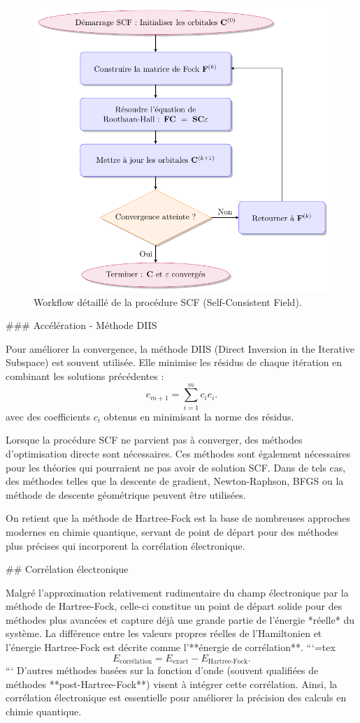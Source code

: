 \documentclass[12pt,a4paper]{report}
\begin{document}
\begin{markdown}
\begin{figure}[tbph]
\centering
\includegraphics[width=0.7\linewidth]{Graphics/SCF_Workflow}
\caption{Workflow détaillé de la procédure SCF (Self-Consistent Field).}
\label{fig:scfworkflow}
\end{figure}

### Accélération - Méthode DIIS

Pour améliorer la convergence, la méthode DIIS (Direct Inversion in the Iterative Subspace) est souvent utilisée. Elle minimise les résidus de chaque itération en combinant les solutions précédentes :
\[
e_{m+1} = \sum_{i=1}^m c_i e_i.
\]
avec des coefficients \(c_i\) obtenus en minimisant la norme des résidus.

Lorsque la procédure SCF ne parvient pas à converger, des méthodes d'optimisation directe sont nécessaires. Ces
méthodes sont également nécessaires pour les théories qui pourraient ne pas avoir de solution SCF. Dans de tels cas, des
méthodes telles que la descente de gradient, Newton-Raphson, BFGS ou la méthode de descente géométrique peuvent être utilisées.

On retient que la méthode de Hartree-Fock est la base de nombreuses approches modernes en chimie quantique, servant de point de départ pour des méthodes plus précises qui incorporent la corrélation électronique.

## Corrélation électronique

Malgré l'approximation relativement rudimentaire du champ électronique par la méthode de Hartree-Fock, celle-ci constitue un point de départ solide pour des méthodes plus avancées et capture déjà une grande partie de l’énergie *réelle* du système. La différence entre les valeurs propres réelles de l’Hamiltonien et l’énergie Hartree-Fock est décrite comme l’**énergie de corrélation**.
```{=tex}
\[
E_{\text{corrélation}} = E_{\text{exact}} - E_{\text{Hartree-Fock}}.
\]
```
 D'autres méthodes basées sur la fonction d'onde (souvent qualifiées de méthodes **post-Hartree-Fock**) visent à intégrer cette corrélation. Ainsi, la corrélation électronique est essentielle pour améliorer la précision des calculs en chimie quantique.
 

\end{markdown}
\end{document}

